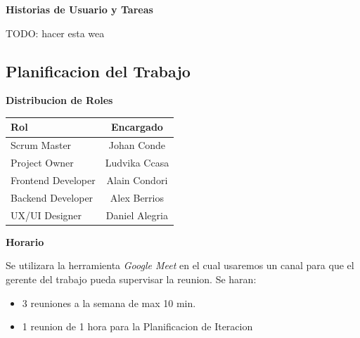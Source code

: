 \noindent\textbf{Historias de Usuario y Tareas}\par
TODO: hacer esta wea


\newpage
\subsection{Planificacion del Trabajo}
\noindent\textbf{Distribucion de Roles}\par
\begin{table}[h]
    \begin{tabular}{|l|c|}
        \hline
        Rol & Encargado \\
        \hline
        Scrum Master & Johan Conde \\
        Project Owner & Ludvika Ccasa \\
        Frontend Developer & Alain Condori \\
        Backend Developer & Alex Berrios \\
        UX/UI Designer & Daniel Alegria \\
        \hline
    \end{tabular}
\end{table}

\noindent\textbf{Horario}\par
Se utilizara la herramienta \textit{Google Meet} en el cual usaremos un canal
para que el gerente del trabajo pueda supervisar la reunion. Se haran:
\begin{itemize}
    \item 3 reuniones a la semana de max 10 min.
    \item 1 reunion de 1 hora para la Planificacion de Iteracion
\end{itemize}

